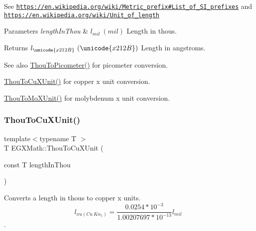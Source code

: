 See \href{https://en.wikipedia.org/wiki/Metric_prefix#List_of_SI_prefixes}{\tt https\+://en.\+wikipedia.\+org/wiki/\+Metric\+\_\+prefix\#\+List\+\_\+of\+\_\+\+S\+I\+\_\+prefixes} and \href{https://en.wikipedia.org/wiki/Unit_of_length}{\tt https\+://en.\+wikipedia.\+org/wiki/\+Unit\+\_\+of\+\_\+length} 
\begin{DoxyParams}{Parameters}
{\em length\+In\+Thou} & $ l_{mil}\ (mil)$ Length in thous. \\
\hline
\end{DoxyParams}
\begin{DoxyReturn}{Returns}
$ l_{\unicode{x212B}}\ (\unicode{x212B})$ Length in angstroms. 
\end{DoxyReturn}
\begin{DoxySeeAlso}{See also}
\mbox{\hyperlink{group___e_g_x_math-_conversions-_length_conversions-_imperial-_thou-_s_i_gabc7a92b07f617bdf0ac0249d34c4aa4c}{Thou\+To\+Picometer()}} for picometer conversion. 

\mbox{\hyperlink{group___e_g_x_math-_conversions-_length_conversions-_imperial-_thou-_non-_s_i_ga5614deb555c0360dfdaa94d01ad35b17}{Thou\+To\+Cu\+X\+Unit()}} for copper x unit conversion. 

\mbox{\hyperlink{group___e_g_x_math-_conversions-_length_conversions-_imperial-_thou-_non-_s_i_ga3eb765800fa51e529878bdae4e997763}{Thou\+To\+Mo\+X\+Unit()}} for molybdenum x unit conversion. 
\end{DoxySeeAlso}
\mbox{\label{group___e_g_x_math-_conversions-_length_conversions-_imperial-_thou-_non-_s_i_ga5614deb555c0360dfdaa94d01ad35b17}} 
\subsubsection{\texorpdfstring{Thou\+To\+Cu\+X\+Unit()}{ThouToCuXUnit()}}
{\footnotesize\ttfamily template$<$typename T $>$ \\
T E\+G\+X\+Math\+::\+Thou\+To\+Cu\+X\+Unit (\begin{DoxyParamCaption}\item[{const T}]{length\+In\+Thou }\end{DoxyParamCaption})}



Converts a length in thous to copper x units. \[ l_{xu(Cu\ K\alpha_1)}=\frac{0.0254 * 10^{-3}}{1.00207697*10^{-13}} l_{mil}\]. 


